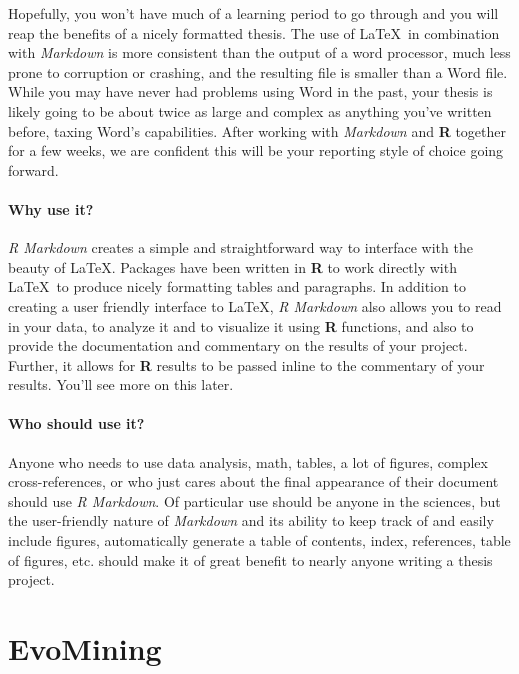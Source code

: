 \documentclass[12pt,twoside]{reedthesis}
\begin{document}
  Hopefully, you won't have much of a learning period to go through and
  you will reap the benefits of a nicely formatted thesis. The use of
  \LaTeX~in combination with \emph{Markdown} is more consistent than the
  output of a word processor, much less prone to corruption or crashing,
  and the resulting file is smaller than a Word file. While you may have
  never had problems using Word in the past, your thesis is likely going
  to be about twice as large and complex as anything you've written
  before, taxing Word's capabilities. After working with \emph{Markdown}
  and \textbf{R} together for a few weeks, we are confident this will be
  your reporting style of choice going forward.
  
  \subsubsection{Why use it?}\label{why-use-it}
  
  \emph{R Markdown} creates a simple and straightforward way to interface
  with the beauty of \LaTeX. Packages have been written in \textbf{R} to
  work directly with \LaTeX~to produce nicely formatting tables and
  paragraphs. In addition to creating a user friendly interface to \LaTeX,
  \emph{R Markdown} also allows you to read in your data, to analyze it
  and to visualize it using \textbf{R} functions, and also to provide the
  documentation and commentary on the results of your project. Further, it
  allows for \textbf{R} results to be passed inline to the commentary of
  your results. You'll see more on this later.
  
  \subsubsection{Who should use it?}\label{who-should-use-it}
  
  Anyone who needs to use data analysis, math, tables, a lot of figures,
  complex cross-references, or who just cares about the final appearance
  of their document should use \emph{R Markdown}. Of particular use should
  be anyone in the sciences, but the user-friendly nature of
  \emph{Markdown} and its ability to keep track of and easily include
  figures, automatically generate a table of contents, index, references,
  table of figures, etc. should make it of great benefit to nearly anyone
  writing a thesis project.
  
  \hypertarget{rmd-basics}{\chapter{EvoMining}\label{rmd-basics}}
  
\end{document}
